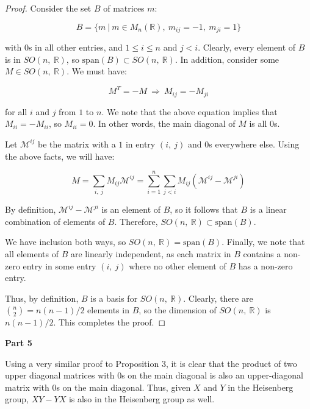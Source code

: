 \documentclass[10pt, oneside]{article}
\begin{document}
    \begin{proof}
      Consider the set $B$ of matrices $m$:

      $$B = \{m \ | \ m \in M_{n}(\mathbb{R}), \ m_{ij} = -1, \ m_{ji} = 1\}$$

      with $0$s in all other entries, and $1 \leq i \leq n$ and $j < i$. Clearly, every element of $B$ is in $SO(n, \ \mathbb{R})$, so $\text{span}(B) \subset SO(n, \ \mathbb{R})$.
      In addition, consider some $M \in SO(n, \ \mathbb{R})$. We must have:

      $$M^{T} = -M \ \Rightarrow \ M_{ij} = -M_{ji}$$

      for all $i$ and $j$ from $1$ to $n$. We note that the above
      equation implies that $M_{ii} = -M_{ii}$, so $M_{ii} = 0$. In other words, the main diagonal of $M$ is all $0$s.

      Let $\mathcal{M}^{ij}$ be the matrix with a $1$ in entry $(i, \ j)$ and $0$s everywhere else. Using the above facts, we will have:

      $$M = \displaystyle\sum_{i, \ j} M_{ij} \mathcal{M}^{ij} = \displaystyle\sum_{i = 1}^{n} \displaystyle\sum_{j < i} M_{ij} (\mathcal{M}^{ij} - \mathcal{M}^{ji})$$

      By definition, $\mathcal{M}^{ij} - \mathcal{M}^{ji}$ is an element of $B$, so it follows that $B$ is a linear combination of elements of $B$. Therefore, $SO(n, \ \mathbb{R}) \subset \text{span}(B)$.
      \newline

      We have inclusion both ways, so $SO(n, \ \mathbb{R}) = \text{span}(B)$. Finally, we note that all elements of $B$ are linearly independent, as each matrix in $B$
      contains a non-zero entry in some entry $(i, \ j)$ where no other element of $B$ has a non-zero entry.
      \newline

      Thus, by definition, $B$ is a basis for $SO(n, \ \mathbb{R})$. Clearly, there are ${n \choose 2} = n(n - 1)/2$ elements in $B$, so the dimension of $SO(n, \ \mathbb{R})$ is $n(n - 1)/2$. This
      completes the proof.
    \end{proof}

    \textbf{Part 5}
    \newline

    Using a very similar proof to Proposition $3$, it is clear that the product of two upper diagonal matrices with $0$s on the main diagonal is also an upper-diagonal
    matrix with $0$s on the main diagonal. Thus, given $X$ and $Y$ in the Heisenberg group, $XY - YX$ is also in the Heisenberg group as well.
    \newline
\end{document}
